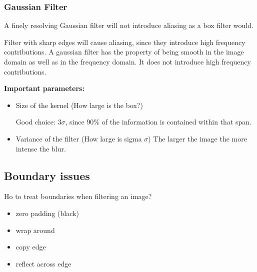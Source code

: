 \documentclass[10pt,a4paper]{scrartcl}
\begin{document}
\begin{multicols*}{2}


\subsubsection{Gaussian Filter}


A finely resolving Gaussian filter will not introduce aliasing as a box filter would.


Filter with sharp edges will cause aliasing, since they introduce high frequency contributions. A gaussian filter has the property of being smooth in the image domain as well as in the frequency domain. It does not introduce high frequency contributions.

\textbf{Important parameters:}

\begin{itemize}
\item Size of the kernel (How large is the box?)

Good choice: 3$\sigma$, since 90\% of the information is contained within that span.
\item Variance of the filter (How large is sigma $\sigma$)
The larger the image the more intense the blur.

\end{itemize}

\subsection{Boundary issues}

Ho to treat boundaries when filtering an image?

\begin{itemize}
\item zero padding (black)
\item wrap around
\item copy edge
\item reflect across edge
\end{itemize}


\end{multicols*}
\end{document}
